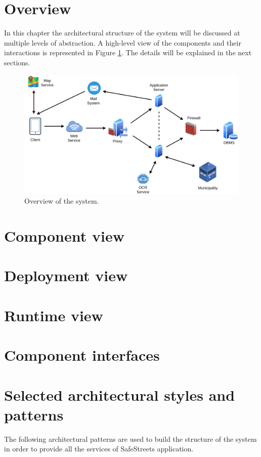 \documentclass{report}
\begin{document}
\section{Overview}
In this chapter the architectural structure of the system will be discussed at multiple levels of abstraction. A high-level view of the components and their interactions is represented in Figure \ref{fig:overview}. The details will be explained in the next sections.
\begin{figure}[!ht]
	\begin{center}
	\includegraphics[width=\textwidth]{img/HighLevelOverview.png}
    \end{center}
    \label{fig:overview}
	\caption{Overview of the system.}
\end{figure}

\section{Component view}

\section{Deployment view}

\section{Runtime view}

\section{Component interfaces}

\section{Selected architectural	styles and patterns}
The following architectural patterns are used to build the structure of the system in order to provide all the services of SafeStreets application.
\end{document}
